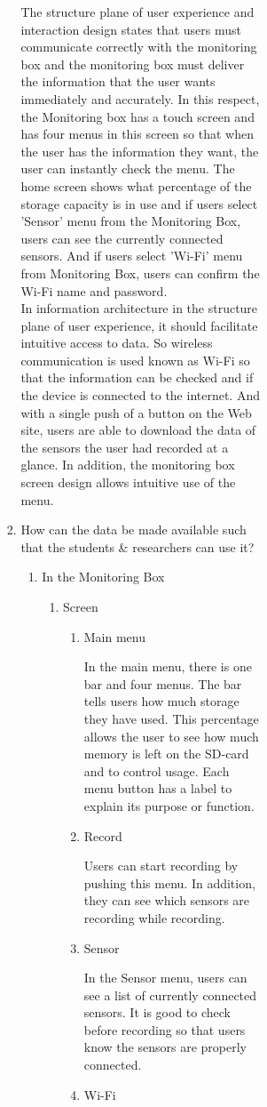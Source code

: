 \documentclass[conference]{IEEEtran}
\begin{document}
\begin{figure*}[ht]
\begin{enumerate}
\begin{enumerate}
\begin{figure*}[!ht]
\begin{enumerate}
				The structure plane of user experience and interaction design states that users must communicate correctly with the monitoring box and the monitoring box must deliver the information that the user wants immediately and accurately. In this respect, the Monitoring box has a touch screen and has four menus in this screen so that when the user has the information they want, the user can instantly check the menu. The home screen shows what percentage of the storage capacity is in use and if users select 'Sensor' menu from the Monitoring Box, users can see the currently connected sensors. And if users select 'Wi-Fi' menu from Monitoring Box, users can confirm the Wi-Fi name and password.\\
				In information architecture in the structure plane of user experience, it should facilitate intuitive access to data. So wireless communication is used known as Wi-Fi so that the information can be checked and if the device is connected to the internet. And with a single push of a button on the Web site, users are able to download the data of the sensors the user had recorded at a glance. In addition, the monitoring box screen design allows intuitive use of the menu.
\\

			\item How can the data be made available such that the students \& researchers can use it?
				\begin{enumerate}
					\item In the Monitoring Box
				\begin{enumerate}
			\item Screen
				\begin{enumerate}
					\item Main menu

						In the main menu, there is one bar and four menus. The bar tells users how much storage they have used. This percentage allows the user to see how much memory is left on the SD-card and to control usage. Each menu button has a label to explain its purpose or function.\\
					\item Record

						Users can start recording by pushing this menu. In addition, they can see which sensors are recording while recording.\\
					\item Sensor

						In the Sensor menu, users can see a list of currently connected sensors. It is good to check before recording so that users know the sensors are properly connected.\\
					\item Wi-Fi


\end{enumerate}
\end{enumerate}
\end{enumerate}
\end{enumerate}
\end{figure*}
\end{enumerate}
\end{enumerate}
\end{figure*}
\end{document}
